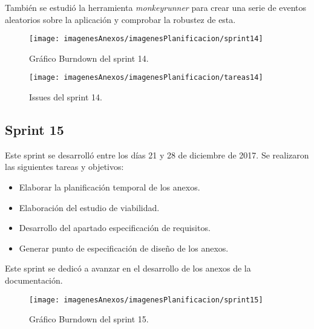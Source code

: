 También se estudió la herramienta \textit{monkeyrunner} para crear una serie de eventos aleatorios sobre la aplicación y comprobar la robustez de esta.
\newpage
\begin{figure}[ht]
    \begin{center}%
        \begin{center}%
          \texttt{[image: imagenesAnexos/imagenesPlanificacion/sprint14]}%
          \caption{Gráfico Burndown del sprint 14.}%
          \label{figSprint14}%
        \end{center}%
  	\end{center}%
\end{figure}%
\newpage
\begin{figure}[h]
    \begin{center}%
        \begin{center}%
          \texttt{[image: imagenesAnexos/imagenesPlanificacion/tareas14]}%
          \caption{Issues del sprint 14.}%
          \label{figTareas14}%
        \end{center}%
  	\end{center}%
\end{figure}%

\newpage

\subsection{Sprint 15}

Este sprint se desarrolló entre los días 21 y 28 de diciembre de 2017. Se realizaron las siguientes tareas y objetivos:

\begin{itemize}
	\item Elaborar la planificación temporal de los anexos.
	\item Elaboración del estudio de viabilidad.
	\item Desarrollo del apartado especificación de requisitos.
	\item Generar punto de especificación de diseño de los anexos.
\end{itemize}

Este sprint se dedicó a avanzar en el desarrollo de los anexos de la documentación.

\newpage
\begin{figure}[ht]
    \begin{center}%
        \begin{center}%
          \texttt{[image: imagenesAnexos/imagenesPlanificacion/sprint15]}%
          \caption{Gráfico Burndown del sprint 15.}%
          \label{figSprint15}%
        \end{center}%
  	\end{center}%
\end{figure}%

